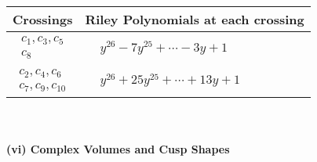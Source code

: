 \documentclass[1p]{elsarticle_modified}
\theoremstyle{definition}
\begin{document}
\begin{tabular}{m{50pt}|m{274pt}}
Crossings & \hspace{64pt}Riley Polynomials at each crossing \\
\hline $$\begin{aligned}c_{1},c_{3},c_{5}\\c_{8}\end{aligned}$$&$\begin{aligned}
&y^{26}-7 y^{25}+\cdots-3 y+1
\end{aligned}$\\
\hline $$\begin{aligned}c_{2},c_{4},c_{6}\\c_{7},c_{9},c_{10}\end{aligned}$$&$\begin{aligned}
&y^{26}+25 y^{25}+\cdots+13 y+1
\end{aligned}$\\
\hline
\end{tabular}\\~\\
\newpage\flushleft \textbf{(vi) Complex Volumes and Cusp Shapes}
\end{document}
